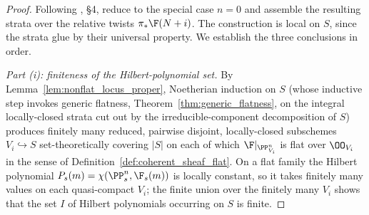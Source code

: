 \begin{proof}
  Following \cite{nitsure-hilbert-quot}, \S4, reduce to the special case \(n = 0\) and assemble
  the resulting strata over the relative twists \(\pi_* \F(N+i)\).  The
  construction is local on \(S\), since the strata glue by their universal
  property.  We establish the three conclusions in order.

  \emph{Part (i): finiteness of the Hilbert-polynomial set.}
  By Lemma~\ref{lem:nonflat_locus_proper}, Noetherian induction on \(S\) (whose
  inductive step invokes generic flatness, Theorem~\ref{thm:generic_flatness},
  on the integral locally-closed strata cut out by the irreducible-component
  decomposition of \(S\)) produces finitely many reduced, pairwise disjoint,
  locally-closed subschemes \(V_i \hookrightarrow S\) set-theoretically covering
  \(|S|\) on each of which \(\F|_{\PP^n_{V_i}}\) is flat over \(\OO_{V_i}\) in
  the sense of Definition~\ref{def:coherent_sheaf_flat}.  On a flat family the
  Hilbert polynomial \(P_s(m) = \chi(\PP^n_s, \F_s(m))\) is locally constant, so
  it takes finitely many values on each quasi-compact \(V_i\); the finite union
  over the finitely many \(V_i\) shows that the set \(I\) of Hilbert polynomials
  occurring on \(S\) is finite.


\end{proof}
